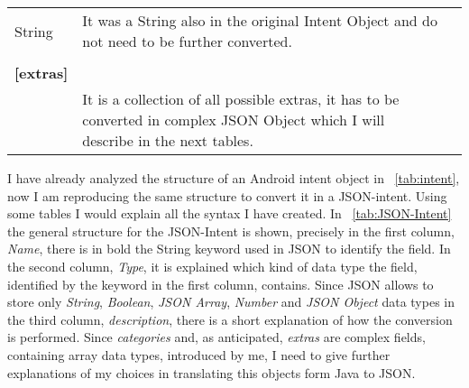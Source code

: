 \begin{table}[h!]
\begin{center}
\begin{tabular}{>{\centering\arraybackslash} m{}p{}p{}}
\begin{minipage}[t]{0.25\textwidth}
				\centering
				String
			\end{minipage} & \begin{minipage}[t]{0.55\textwidth}
				It was a String also in the original Intent Object and do not need to be further converted.
			\end{minipage}\\%
			&&\\
			\centering\textbf{[extras]}\footnotemark[1] & \begin{minipage}[t]{0.25\textwidth}
				\centering
				Array\\<Bundle Object>\footnotemark[2]
			\end{minipage} & \begin{minipage}[t]{0.55\textwidth}
				It is a collection of all possible extras, it has to be converted in complex JSON Object which I will describe in the next tables.
			\end{minipage}\\%
			\bottomrule
		\end{tabular}
	\end{center}
\end{table}
I have already analyzed the structure of an Android intent object in \tablename~\ref{tab:intent}, now I am reproducing the same structure to convert it in a JSON-intent. Using some tables I would explain all the syntax I have created. In \tablename~\ref{tab:JSON-Intent} the general structure for the JSON-Intent is shown, precisely in the first column, \textit{Name}, there is in bold the String keyword used in JSON to identify the field. In the second column, \textit{Type}, it is explained which kind of data type the field, identified by the keyword in the first column, contains. Since JSON allows to store only \textit{String},	\textit{Boolean}, \textit{JSON Array}, \textit{Number} and \textit{JSON Object} data types in the third column, \textit{description}, there is a short explanation of how the conversion is performed.
Since \textit{categories} and, as anticipated, \textit{extras} are complex fields, containing array data types, introduced by me, I need to give further explanations of my choices in translating this objects form Java to JSON.

